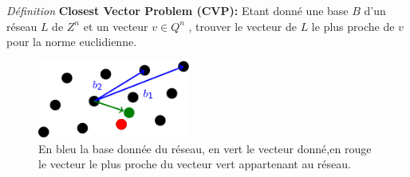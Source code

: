 \documentclass[a4paper,12pt]{article}
\begin{document}
  \newpage
\textit{Définition} \textbf{Closest Vector Problem (CVP):}\newline
Etant donné une base $B$ d’un réseau $L$ de $Z^n$ et un vecteur $v \in Q^n$ , trouver le vecteur de $L$ le plus proche de $v$ pour la norme euclidienne.\newline
\newline
\newline
\begin{figure}[h!]\begin{center}
    \includegraphics[width=5cm]{cvp.png}
    \caption{En bleu la base donnée du réseau, en vert le vecteur donné,en rouge le vecteur le plus proche du vecteur vert appartenant au réseau.}
    \label{fig:cvp}
  \end{center}
  \end{figure}
\end{document}
